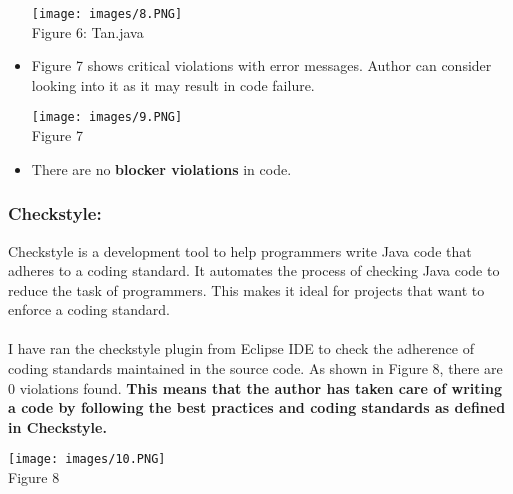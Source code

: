 \documentclass[10pt,letterpaper]{article}
\begin{document}
\begin{itemize}
    \begin{center}
    \texttt{[image: images/8.PNG]}\\
    \caption{Figure 6: Tan.java}
\end{center}
\item Figure 7 shows critical violations with error messages. Author can consider looking into it as it may result in code failure.
    \begin{center}
    \texttt{[image: images/9.PNG]}\\
    \caption{Figure 7}
    \end{center}
\item There are no \textbf{blocker violations} in code.
\end{itemize}
\subsubsection{Checkstyle:}
Checkstyle is a development tool to help programmers write Java code that adheres to a coding standard. It automates the process of checking Java code to reduce the task of programmers. This makes it ideal for projects that want to enforce a coding standard. \cite{Sourceforge}
\\\\
I have ran the checkstyle plugin from Eclipse IDE to check the adherence of coding standards maintained in the source code. As shown in Figure 8, there are 0 violations found. \textbf{This means that the author has taken care of writing a code by following the best practices and coding standards as defined in Checkstyle.}  
\begin{center}
    \texttt{[image: images/10.PNG]}\\
    \caption{Figure 8}
\end{center}

\newpage
\end{document}
